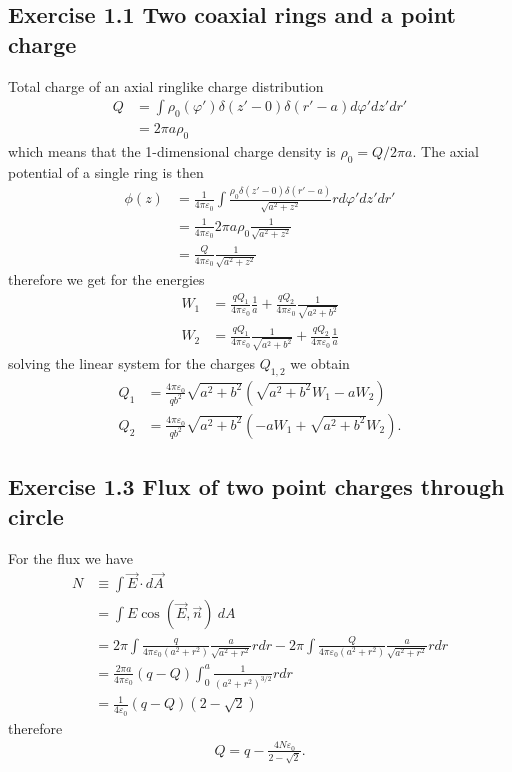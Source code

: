 \documentclass[10pt,a4paper]{book}
\theoremstyle{definition}
\begin{document}
\subsection{Exercise 1.1 Two coaxial rings and a point charge}
Total charge of an axial ringlike charge distribution
\begin{align}
    Q&=\int \rho_0(\varphi')\delta(z'-0)\delta(r'-a) d\varphi' dz' dr'\\
    &=2\pi a\rho_0
\end{align}
which means that the 1-dimensional charge density is $\rho_0=Q/2\pi a$.
The axial potential of a single ring is then
\begin{align}
    \phi(z)&=\frac{1}{4\pi\varepsilon_0}\int\frac{\rho_0\delta(z'-0)\delta(r'-a)}{\sqrt{a^2+z^2}}r d\varphi' dz' dr'\\
    &=\frac{1}{4\pi\varepsilon_0}2\pi a \rho_0\frac{1}{\sqrt{a^2+z^2}}\\
    &=\frac{Q}{4\pi\varepsilon_0}\frac{1}{\sqrt{a^2+z^2}}
\end{align}
therefore we get for the energies
\begin{align}
    W_1&=\frac{qQ_1}{4\pi\varepsilon_0}\frac{1}{a}+\frac{qQ_2}{4\pi\varepsilon_0}\frac{1}{\sqrt{a^2+b^2}}\\
    W_2&=\frac{qQ_1}{4\pi\varepsilon_0}\frac{1}{\sqrt{a^2+b^2}}+\frac{qQ_2}{4\pi\varepsilon_0}\frac{1}{a}
\end{align}
solving the linear system for the charges $Q_{1,2}$ we obtain
\begin{align}
    Q_1&=\frac{4\pi\varepsilon_0}{qb^2}\sqrt{a^2+b^2}\left(\sqrt{a^2+b^2}W_1-aW_2\right)\\
    Q_2&=\frac{4\pi\varepsilon_0}{qb^2}\sqrt{a^2+b^2}\left(-aW_1+\sqrt{a^2+b^2}W_2\right).
\end{align}

\subsection{Exercise 1.3 Flux of two point charges through circle}
For the flux we have
\begin{align}
    N&\equiv\int\vec{E}\cdot d\vec{A}\\
    &=\int E \cos(\vec{E},\vec{n})\ dA\\
    &=2\pi\int\frac{q}{4\pi\varepsilon_0(a^2+r^2)}\frac{a}{\sqrt{a^2+r^2}}rdr-2\pi\int\frac{Q}{4\pi\varepsilon_0(a^2+r^2)}\frac{a}{\sqrt{a^2+r^2}}rdr\\
    &=\frac{2\pi a}{4\pi\varepsilon_0}(q-Q)\int_0^a\frac{1}{(a^2+r^2)^{3/2}}rdr\\
    &=\frac{1}{4\varepsilon_0}(q-Q)\left(2-\sqrt{2}\right)
\end{align}
therefore
\begin{align}
    Q=q-\frac{4N\varepsilon_0}{2-\sqrt{2}}.
\end{align}
\end{document}
